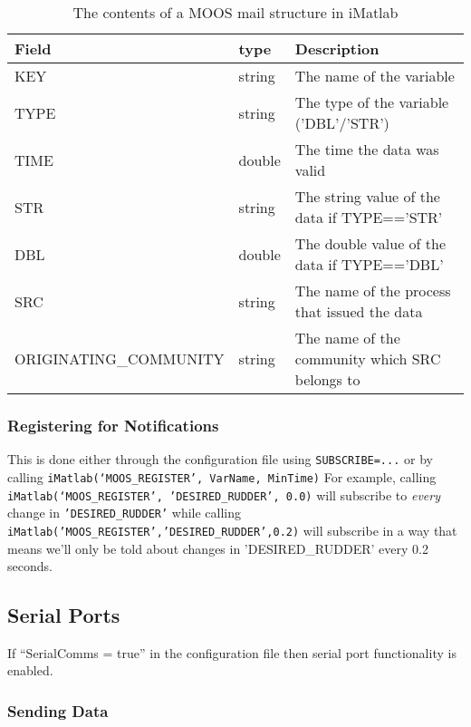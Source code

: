 \documentclass[a4paper,10pt]{article}
\newcommand{\Code}[1]{\texttt{#1} }
\newcommand{\code}[1]{\Code{#1} }
\begin{document}
\begin{table}[ht]
\centering
\begin{tabularx}{\linewidth}{p{2.5in}|p{1in}|X}
\textbf{Field} &  \textbf{type} &\textbf{Description}\\
\hline
KEY                    & string & The name of the variable\\
TYPE                   & string & The type of the variable
('DBL'/'STR')\\
TIME                    &double & The time the data was valid\\
STR                    & string & The string value of the data if TYPE=='STR'\\
DBL                     &double & The double value of the data if TYPE=='DBL'\\
SRC                    & string & The name of the process that issued the data\\
ORIGINATING\_COMMUNITY &  string & The name of the community which
SRC belongs to\\\hline
\end{tabularx}
 \caption{The contents of a MOOS mail
structure in iMatlab} \normalsize
\label{Tab:iMatlabMail}
\end{table}




\subsubsection{Registering for Notifications}

This is done either through the configuration file using
\code{SUBSCRIBE=...} or by calling
\code{iMatlab(`MOOS\_REGISTER', VarName, MinTime)} For example,
calling \code{iMatlab(`MOOS\_REGISTER', 'DESIRED\_RUDDER', 0.0)}
will subscribe to \emph{every} change in \code{'DESIRED\_RUDDER'}
while calling
\code{iMatlab('MOOS\_REGISTER','DESIRED\_RUDDER',0.2)} will
subscribe in a way that means we'll only be told about changes in
'DESIRED\_RUDDER' every 0.2 seconds.


\subsection{Serial Ports}

If ``SerialComms = true''  in the configuration file then serial
port functionality is enabled.

\subsubsection{Sending Data}
\end{document}
